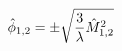 \begin{equation}\label{ventidue}
{\hat \phi _{1,2} = \pm { \sqrt  { {3 \over \lambda } \hat M _{1,2}^2}}}
\end{equation}

